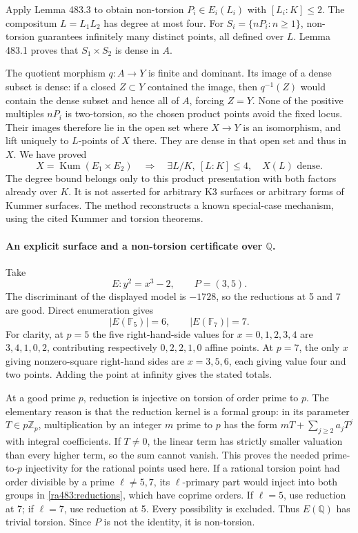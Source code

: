 \documentclass[11pt]{article}
\begin{document}
Apply Lemma 483.3 to obtain non-torsion $P_i\in E_i(L_i)$ with
$[L_i:K]\le2$. The compositum $L=L_1L_2$ has degree at most four.
For $S_i=\{nP_i:n\ge1\}$, non-torsion guarantees infinitely many
distinct points, all defined over $L$. Lemma 483.1 proves that
$S_1\times S_2$ is dense in $A$.

The quotient morphism $q:A\to Y$ is finite and dominant. Its image of a
dense subset is dense: if a closed $Z\subset Y$ contained the image,
then $q^{-1}(Z)$ would contain the dense subset and hence all of $A$,
forcing $Z=Y$. None of the positive multiples $nP_i$ is two-torsion, so
the chosen product points avoid the fixed locus. Their images therefore
lie in the open set where $X\to Y$ is an isomorphism, and lift uniquely
to $L$-points of $X$ there. They are dense in that open set and thus in
$X$. We have proved
\begin{equation}\label{ra483:kummer}
 X=\operatorname{Kum}(E_1\times E_2)
 \quad\Longrightarrow\quad
 \exists L/K,\ [L:K]\le4,\quad X(L)\text{ dense}.
\end{equation}
The degree bound belongs only to this product presentation with both
factors already over $K$. It is not asserted for arbitrary K3 surfaces
or arbitrary forms of Kummer surfaces. The method reconstructs a known
special-case mechanism, using the cited Kummer and torsion theorems.

\paragraph{An explicit surface and a non-torsion certificate over $\mathbb Q$.}
Take
\[
 E:y^2=x^3-2,\qquad P=(3,5).
\]
The discriminant of the displayed model is $-1728$, so the reductions at
5 and 7 are good. Direct enumeration gives
\begin{equation}\label{ra483:reductions}
 |E(\mathbb F_5)|=6,\qquad |E(\mathbb F_7)|=7.
\end{equation}
For clarity, at $p=5$ the five right-hand-side values for $x=0,1,2,3,4$
are $3,4,1,0,2$, contributing respectively $0,2,2,1,0$ affine points.
At $p=7$, the only $x$ giving nonzero-square right-hand sides are
$x=3,5,6$, each giving value four and two points. Adding the point at
infinity gives the stated totals.

At a good prime $p$, reduction is injective on torsion of order prime to
$p$. The elementary reason is that the reduction kernel is a formal
group: in its parameter $T\in p\mathbb Z_p$, multiplication by an integer
$m$ prime to $p$ has the form $mT+\sum_{j\ge2}a_jT^j$ with integral
coefficients. If $T\ne0$, the linear term has strictly smaller valuation
than every higher term, so the sum cannot vanish. This proves the needed
prime-to-$p$ injectivity for the rational points used here.
If a rational torsion point had order divisible by a prime $\ell\ne5,7$,
its $\ell$-primary part would inject into both groups in
\eqref{ra483:reductions}, which have coprime orders. If $\ell=5$, use
reduction at 7; if $\ell=7$, use reduction at 5. Every possibility is
excluded. Thus $E(\mathbb Q)$ has trivial torsion. Since $P$ is not the
identity, it is non-torsion.
\end{document}
